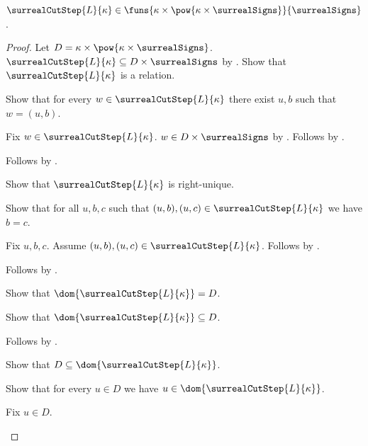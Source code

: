 \begin{proposition}\label{surreal_cut_step_type}
    $\surrealCutStep{L}{\kappa}\in
        \funs{\kappa\times\pow{\kappa\times\surrealSigns}}
            {\surrealSigns}$.
\end{proposition}
\begin{proof}
    Let $D=\kappa\times\pow{\kappa\times\surrealSigns}$.
    $\surrealCutStep{L}{\kappa}\subseteq D\times\surrealSigns$
        by .
    Show that $\surrealCutStep{L}{\kappa}$ is a relation.
    \begin{subproof}
        Show that for every $w\in\surrealCutStep{L}{\kappa}$
            there exist $u,b$ such that $w=(u,b)$.
        \begin{subproof}
            Fix $w\in\surrealCutStep{L}{\kappa}$.
            $w\in D\times\surrealSigns$ by .
            Follows by .
        \end{subproof}
        Follows by .
    \end{subproof}
    Show that $\surrealCutStep{L}{\kappa}$ is right-unique.
    \begin{subproof}
        Show that for all $u,b,c$ such that
            $(u,b),(u,c)\in\surrealCutStep{L}{\kappa}$ we have $b=c$.
        \begin{subproof}
            Fix $u,b,c$.
            Assume $(u,b),(u,c)\in\surrealCutStep{L}{\kappa}$.
            Follows by
                .
        \end{subproof}
        Follows by .
    \end{subproof}
    Show that $\dom{\surrealCutStep{L}{\kappa}}=D$.
    \begin{subproof}
        Show that $\dom{\surrealCutStep{L}{\kappa}}\subseteq D$.
        \begin{subproof}
            Follows by
                .
        \end{subproof}
        Show that $D\subseteq\dom{\surrealCutStep{L}{\kappa}}$.
        \begin{subproof}
            Show that for every $u\in D$ we have
                $u\in\dom{\surrealCutStep{L}{\kappa}}$.
            \begin{subproof}
                Fix $u\in D$.
                \begin{byCase}

\end{byCase}
\end{subproof}
\end{subproof}
\end{subproof}
\end{proof}
